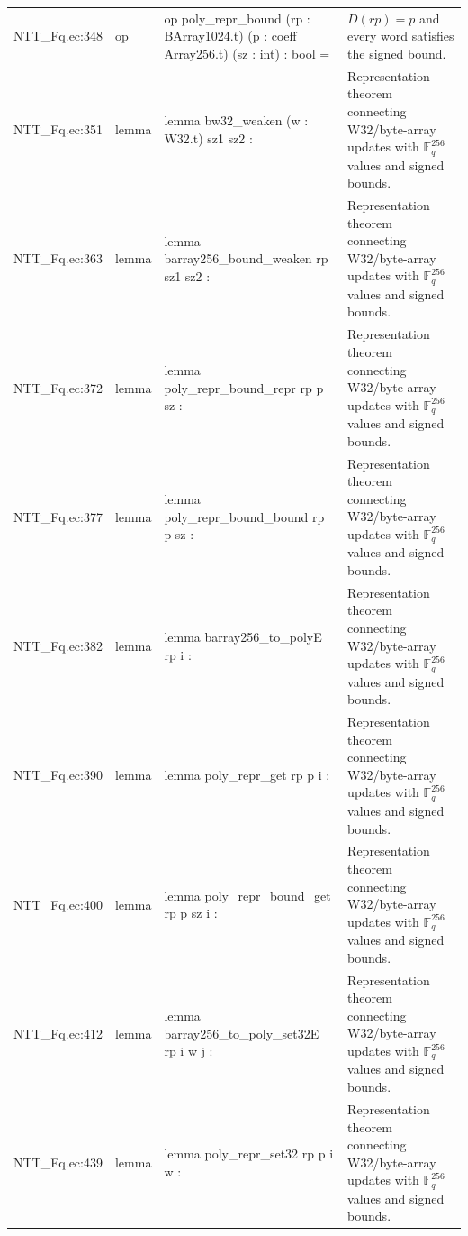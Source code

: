 \documentclass[10pt]{article}
\begin{document}
\begin{longtable}{L{0.11\textwidth}L{0.05\textwidth}L{0.38\textwidth}L{0.42\textwidth}}
NTT\_Fq.\allowbreak{}ec:\allowbreak{}348 & op & {\ttfamily\scriptsize op poly\_repr\_bound (rp : BArray1024.t) (p : coeff Array256.t) (sz : int) : bool =} & $D(rp)=p$ and every word satisfies the signed bound. \\
NTT\_Fq.\allowbreak{}ec:\allowbreak{}351 & lemma & {\ttfamily\scriptsize lemma bw32\_weaken (w : W32.t) sz1 sz2 :} & Representation theorem connecting W32/byte-array updates with $\mathbb F_q^{256}$ values and signed bounds. \\
NTT\_Fq.\allowbreak{}ec:\allowbreak{}363 & lemma & {\ttfamily\scriptsize lemma barray256\_bound\_weaken rp sz1 sz2 :} & Representation theorem connecting W32/byte-array updates with $\mathbb F_q^{256}$ values and signed bounds. \\
NTT\_Fq.\allowbreak{}ec:\allowbreak{}372 & lemma & {\ttfamily\scriptsize lemma poly\_repr\_bound\_repr rp p sz :} & Representation theorem connecting W32/byte-array updates with $\mathbb F_q^{256}$ values and signed bounds. \\
NTT\_Fq.\allowbreak{}ec:\allowbreak{}377 & lemma & {\ttfamily\scriptsize lemma poly\_repr\_bound\_bound rp p sz :} & Representation theorem connecting W32/byte-array updates with $\mathbb F_q^{256}$ values and signed bounds. \\
NTT\_Fq.\allowbreak{}ec:\allowbreak{}382 & lemma & {\ttfamily\scriptsize lemma barray256\_to\_polyE rp i :} & Representation theorem connecting W32/byte-array updates with $\mathbb F_q^{256}$ values and signed bounds. \\
NTT\_Fq.\allowbreak{}ec:\allowbreak{}390 & lemma & {\ttfamily\scriptsize lemma poly\_repr\_get rp p i :} & Representation theorem connecting W32/byte-array updates with $\mathbb F_q^{256}$ values and signed bounds. \\
NTT\_Fq.\allowbreak{}ec:\allowbreak{}400 & lemma & {\ttfamily\scriptsize lemma poly\_repr\_bound\_get rp p sz i :} & Representation theorem connecting W32/byte-array updates with $\mathbb F_q^{256}$ values and signed bounds. \\
NTT\_Fq.\allowbreak{}ec:\allowbreak{}412 & lemma & {\ttfamily\scriptsize lemma barray256\_to\_poly\_set32E rp i w j :} & Representation theorem connecting W32/byte-array updates with $\mathbb F_q^{256}$ values and signed bounds. \\
NTT\_Fq.\allowbreak{}ec:\allowbreak{}439 & lemma & {\ttfamily\scriptsize lemma poly\_repr\_set32 rp p i w :} & Representation theorem connecting W32/byte-array updates with $\mathbb F_q^{256}$ values and signed bounds. \\

\end{longtable}
\end{document}
